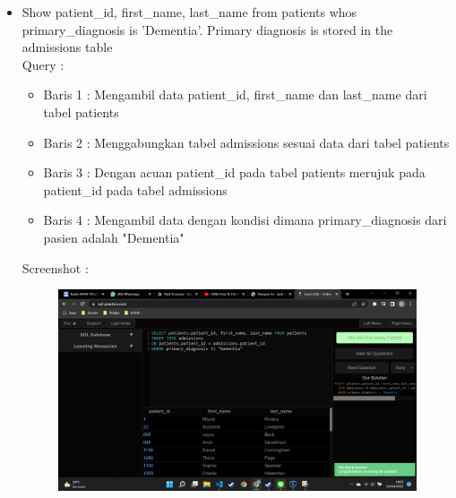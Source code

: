 \documentclass[]{article}
\begin{document}
\begin{itemize}
        \item Show patient\_id, first\_name, last\_name from patients whos
        \\primary\_diagnosis is 'Dementia'. Primary diagnosis is stored in the admissions table
        \\Query :
        
        \begin{itemize}
            \item Baris 1 : Mengambil data patient\_id, first\_name dan last\_name dari tabel patients
            \item Baris 2 : Menggabungkan tabel admissions sesuai data dari tabel patients
            \item Baris 3 : Dengan acuan patient\_id pada tabel patients merujuk pada patient\_id pada tabel admissions
            \item Baris 4 : Mengambil data dengan kondisi dimana primary\_diagnosis dari pasien adalah "Dementia"
        \end{itemize}
        \pagebreak
        Screenshot :
        \begin{figure}[h]
            \includegraphics[scale=0.3]{./Screenshot/Medium-4.png}
            \centering
        \end{figure}


\end{itemize}
\end{document}

